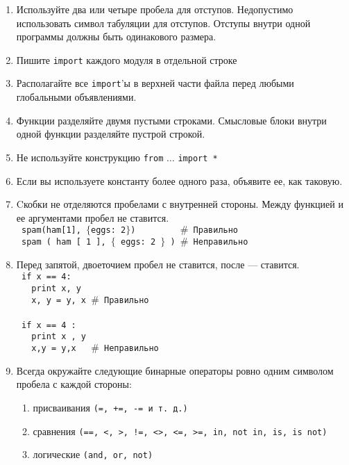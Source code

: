 \documentclass[11pt,a4paper,oneside]{article}
\begin{document}
\begin{enumerate}
    \item Используйте два или четыре пробела для отступов. 
          Недопустимо использовать символ табуляции для отступов. 
          Отступы внутри одной программы должны быть одинакового размера.
    \item Пишите \texttt{import} каждого модуля в отдельной строке
    \item Располагайте все \texttt{import}'ы в верхней части файла перед любыми глобальными объявлениями.
    \item Функции разделяйте двумя пустыми строками. 
          Смысловые блоки внутри одной функции разделяйте пустрой строкой.
    \item Не используйте конструкцию \texttt{from} $\dots$ \texttt{import *}
    \item Если вы используете константу более одного раза, объявите ее, как таковую.
    \item Cкобки не отделяются пробелами с внутренней стороны. 
          Между функцией и ее аргументами пробел не ставится.
          \\ \texttt{ spam(ham[1], $\{$eggs: 2$\}$) \hbox{ } \hbox{ } \hbox{ } \hbox{ } $\#$ Правильно}
          \\ \texttt{ spam ( ham [ 1 ], $\{$ eggs: 2 $\}$ ) $\#$ Неправильно}
    \item Перед запятой, двоеточием пробел не ставится, после --- ставится.
          \\ \texttt{ if x == 4:}
          \\ \texttt{ \hbox{ }  print x, y}
          \\ \texttt{ \hbox{ }  x, y = y, x   $\#$ Правильно}
          \\
          \\ \texttt{ if x == 4 :}
          \\ \texttt{ \hbox{ }  print x , y}
          \\ \texttt{ \hbox{ }  x,y = y,x   \hbox{ } $\#$ Неправильно}
    \item Всегда окружайте следующие бинарные операторы ровно одним символом пробела с каждой стороны:
          \begin{enumerate}
            \item присваивания \texttt{(=, +=, -= и т. д.)}
            \item сравнения \texttt{(==, <, >, !=, <>, <=, >=, in, not in, is, is not)}
            \item логические \texttt{(and, or, not)}

\end{enumerate}
\end{enumerate}
\end{document}
